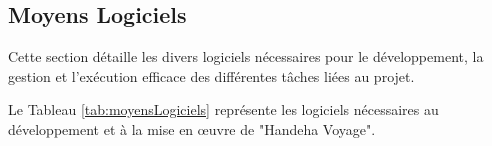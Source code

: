 \documentclass[12pt]{report}
\begin{document}
				\begin{table}[h]
				  \centering
				  \caption{Inventaire des moyens matériels}
				  \label{tab:moyensMateriels}
				\end{table}
				\FloatBarrier

				\subsection{Moyens Logiciels}

				\hspace{15pt} Cette section détaille les divers logiciels nécessaires pour le développement, la gestion et l'exécution efficace des différentes tâches liées au projet.

				Le Tableau \ref{tab:moyensLogiciels} représente les logiciels nécessaires au développement et à la mise en œuvre de "Handeha Voyage".
\end{document}
